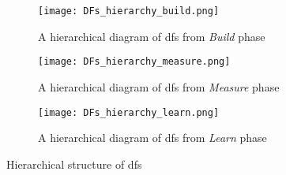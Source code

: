 \begin{figure}[htbp!]
    \centering
    \begin{subfigure}[b]{1.0\textwidth}
    \centering
    \texttt{[image: DFs\_hierarchy\_build.png]}
    \caption{A hierarchical diagram of \ac{df}s from \textit{Build} phase}
    \label{fig:implementation:hierarchy:build}
    \end{subfigure}
    \begin{subfigure}[b]{1.0\textwidth}
    \centering
    \texttt{[image: DFs\_hierarchy\_measure.png]}
    \caption{A hierarchical diagram of \ac{df}s from \textit{Measure} phase}
    \label{fig:implementation:hierarchy:measure} 
    \end{subfigure}             
    \begin{subfigure}[b]{0.8\textwidth}
    \centering
    \texttt{[image: DFs\_hierarchy\_learn.png]}
    \caption{A hierarchical diagram of \ac{df}s from \textit{Learn} phase}
    \label{fig:implementation:hierarchy:learn}
    \end{subfigure}
    \caption[A map between \ac{dp}s and \ac{df}s]{Hierarchical structure of \ac{df}s}
    \label{fig:implementation:hierarchy}
\end{figure}
